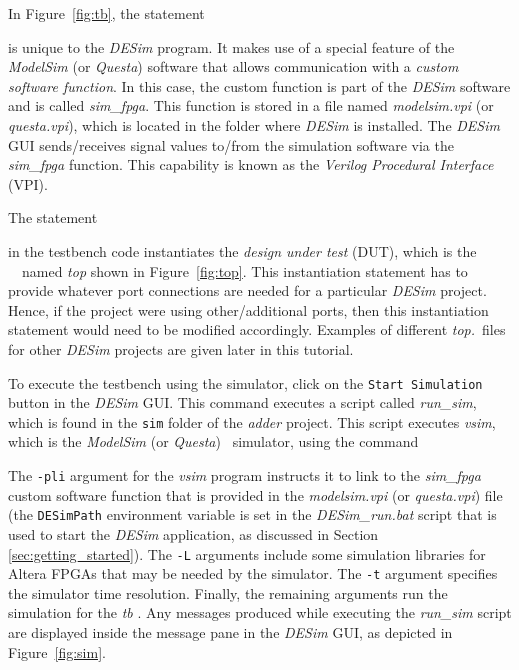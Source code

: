 {In Figure~\ref{fig:tb}, the statement



is unique to the {\it DESim} program. It makes use of a special feature of the
{\it ModelSim} (or {\it Questa}) software that allows communication with a 
{\it custom software function}. In this case, the custom function is part of the {\it DESim} 
software and is called {\it sim\_fpga}. This function is stored in a file named 
{\it modelsim.vpi} (or {\it questa.vpi}), which is located in the folder where {\it DESim} is
installed. The {\it DESim} GUI sends/receives signal values to/from the simulation software 
via the {\it sim\_fpga} function. 
This capability is known as the {\it Verilog Procedural Interface} (VPI). 

The statement



in the testbench code instantiates the {\it design under test} (DUT), which is the 
\hdlName~\hdlModuleName~named {\it top} shown in Figure~\ref{fig:top}. This instantiation
statement has to provide whatever port connections are needed for a particular {\it DESim}
project. Hence, if the project were using other/additional ports, then this
instantiation statement would need to be modified accordingly. Examples of different 
{\it top.\hdlFileExt}~files for other {\it DESim} projects are given later in this tutorial.

To execute the testbench using the simulator, click on the \texttt{Start Simulation} button 
in the {\it DESim} GUI. This command executes a script called {\it run\_sim}, which is found 
in the \texttt{sim} folder of the {\it adder} project. This script executes 
{\it vsim}, which is the {\it ModelSim} (or {\it Questa}) 
\hdlName~simulator, using the command
~\\
\ifverilog
    
\else
    
\fi

The \texttt{-pli} argument for the {\it vsim} program instructs 
it to link to the {\it sim\_fpga} custom software function that is provided in the
{\it modelsim.vpi} (or {\it questa.vpi}) file (the \texttt{DESimPath} 
environment variable is set in the {\it DESim\_run.bat} script that is
used to start the {\it DESim} application, as discussed in Section \ref{sec:getting_started}).
The \texttt{-L} arguments include some simulation libraries for
Altera FPGAs that may be needed by the simulator. The \texttt{-t} argument specifies
the simulator time resolution. Finally, the remaining arguments \ifverilog{}\fi
run the simulation for the {\it tb} \hdlModuleName. Any messages 
produced while executing the {\it run\_sim} script are displayed inside the message pane in
the {\it DESim} GUI, as depicted in Figure~\ref{fig:sim}.

}
